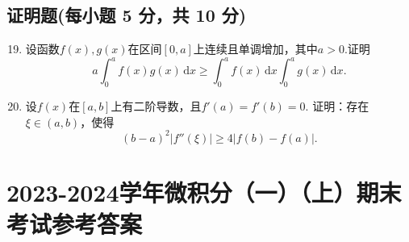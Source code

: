 \documentclass[../Main.tex]{subfiles}
\begin{document}
\section{证明题(每小题 5 分，共 10 分)}
\begin{enumerate}
    \setcounter{enumi}{18}
    \item 设函数$f(x),g(x)$在区间$[0,a]$上连续且单调增加，其中$a>0$.证明
          \[
              a\int_{0}^{a}f(x)g(x)\,\mathrm{d}x\geq \int_{0}^{a}f(x)\,\mathrm{d}x\int_{0}^{a}
              g(x)\,\mathrm{d}x.
          \]
          \vspace{14em}

    \item 设$f(x)$在$[a,b]$上有二阶导数，且$f'(a)=f'(b)=0$. 证明：存在$\xi\in
              (a,b)$，使得
          \[
              (b-a)^{2}|f''(\xi)|\geq 4|f(b)-f(a)|.
          \]
          \vspace{14em}
\end{enumerate}

\chapter{2023-2024学年微积分（一）（上）期末考试参考答案}
\end{document}
